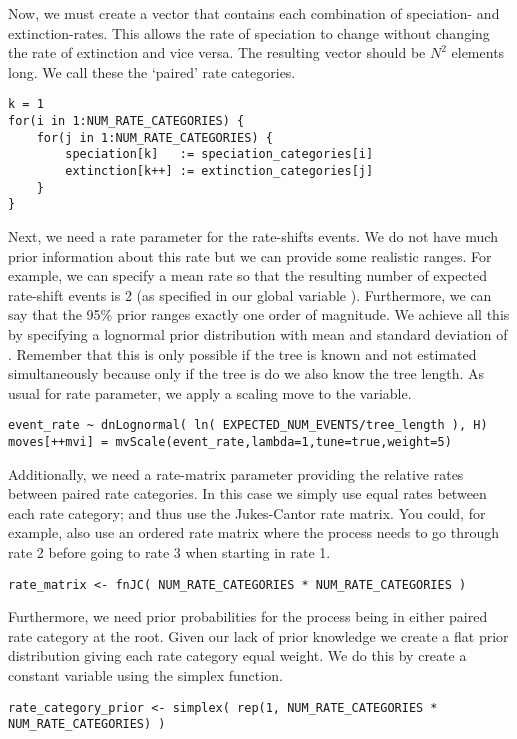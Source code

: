 Now, we must create a vector that contains each combination of speciation- and extinction-rates.
This allows the rate of speciation to change without changing the rate of extinction and vice versa.
The resulting vector should be $N^2$ elements long.
We call these the `paired' rate categories.

{\tt \begin{snugshade*}
\begin{lstlisting}
k = 1
for(i in 1:NUM_RATE_CATEGORIES) {
    for(j in 1:NUM_RATE_CATEGORIES) {
        speciation[k]   := speciation_categories[i]
        extinction[k++] := extinction_categories[j]
    }
}
\end{lstlisting}
\end{snugshade*}}

Next, we need a rate parameter for the rate-shifts events.
We do not have much prior information about this rate but we can provide some realistic ranges.
For example, we can specify a mean rate so that the resulting number of expected rate-shift events is 2 (as specified in our global variable ).
Furthermore, we can say that the 95\% prior ranges exactly one order of magnitude.
We achieve all this by specifying a lognormal prior distribution with mean  and standard deviation of .
Remember that this is only possible if the tree is known and not estimated simultaneously because only if the tree is do we also know the tree length.
As usual for rate parameter, we apply a scaling move to the  variable.
{\tt \begin{snugshade*}
\begin{lstlisting}
event_rate ~ dnLognormal( ln( EXPECTED_NUM_EVENTS/tree_length ), H)
moves[++mvi] = mvScale(event_rate,lambda=1,tune=true,weight=5)
\end{lstlisting}
\end{snugshade*}}

Additionally, we need a rate-matrix parameter providing the relative rates between paired rate categories.
In this case we simply use equal rates between each rate category; and thus use the Jukes-Cantor rate matrix.
You could, for example, also use an ordered rate matrix where the process needs to go through rate 2 before going to rate 3 when starting in rate 1.
{\tt \begin{snugshade*}
\begin{lstlisting}
rate_matrix <- fnJC( NUM_RATE_CATEGORIES * NUM_RATE_CATEGORIES )
\end{lstlisting}
\end{snugshade*}}
Furthermore, we need prior probabilities for the process being in either paired rate category at the root.
Given our lack of prior knowledge we create a flat prior distribution giving each rate category equal weight.
We do this by create a constant variable using the simplex function.
{\tt \begin{snugshade*}
\begin{lstlisting}
rate_category_prior <- simplex( rep(1, NUM_RATE_CATEGORIES * NUM_RATE_CATEGORIES) )
\end{lstlisting}
\end{snugshade*}}



